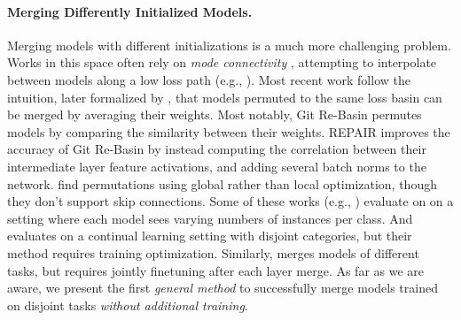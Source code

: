 \paragraph{Merging Differently Initialized Models.}
Merging models with different initializations is a much more challenging problem. 
Works in this space often rely on \textit{mode connectivity} \cite{freeman2016topology,garipov2018loss,draxler2018essentially,frankle2020linear}, attempting to interpolate between models along a low loss path (e.g., \citet{tatro2020optimizing,singh2020model,liu2022deep}).
Most recent work follow the intuition, later formalized by \citet{entezari2021role}, that models permuted to the same loss basin can be merged by averaging their weights. Most notably, Git Re-Basin \cite{ainsworth2022git} permutes models
by comparing the similarity between their weights. REPAIR \cite{jordan2022repair} improves the accuracy of Git Re-Basin by instead computing the correlation between their intermediate layer feature activations, and adding several batch norms to the network. \citet{pena2022re} find permutations using global rather than local optimization, though they don't support skip connections.
Some of these works (e.g., \citet{singh2020model,ainsworth2022git}) evaluate on on a setting where each model sees varying numbers of instances per class. And \citet{pena2022re} evaluates on a continual learning setting with disjoint categories, but their method requires training optimization.
Similarly, \citet{he2018multi} merges models of different tasks, but requires jointly finetuning after each layer merge.
As far as we are aware, we present the first \textit{general method} to successfully merge models trained on disjoint tasks \textit{without additional training}.

